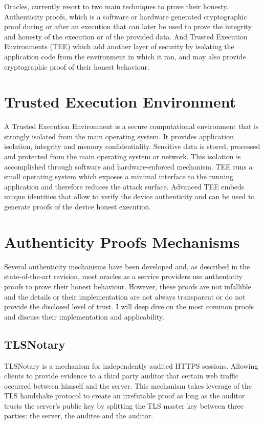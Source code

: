 Oracles, currently resort to two main techniques to prove their honesty. Authenticity proofs, which is a software or hardware generated cryptographic proof during or after an execution that can later be used to prove the integrity and honesty of the execution or of the provided data. And Trusted Execution Environments (TEE) which add another layer of security by isolating the application code from the environment in which it ran, and may also provide cryptographic proof of their honest behaviour.

\section{Trusted Execution Environment}
A Trusted Execution Environment is a secure computational environment that is strongly isolated from the main operating system. It provides application isolation, integrity and memory confidentiality. Sensitive data is stored, processed and protected from the main operating system or network. This isolation is accomplished through software and hardware-enforced mechanism. TEE runs a small operating system which exposes a minimal interface to the running application and therefore reduces the attack surface. Advanced TEE embeds unique identities that allow to verify the device authenticity and can be used to generate proofs of the device honest execution.

\section{Authenticity Proofs Mechanisms}

Several authenticity mechanisms have been developed and, as described in the state-of-the-art revision, most oracles as a service providers use authenticity proofs to prove their honest behaviour. However, these proofs are not infallible and the details or their implementation are not always transparent or do not provide the disclosed level of trust. I will deep dive on the most common proofs and discuss their implementation and applicability.

\subsection{TLSNotary}

TLSNotary is a mechanism for independently audited HTTPS sessions. Allowing clients to provide evidence to a third party auditor that certain web traffic occurred between himself and the server. This mechanism takes leverage of the TLS handshake protocol to create an irrefutable proof as long as the auditor trusts the server's public key by splitting the TLS master key between three parties: the server, the auditee and the auditor.

